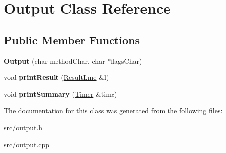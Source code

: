 \hypertarget{class_output}{\section{Output Class Reference}
\label{class_output}
}
\subsection*{Public Member Functions}
\begin{DoxyCompactItemize}
\item 
\hypertarget{class_output_a7f407dc5dc134b08fe85414b290c68fd}{{\bfseries Output} (char method\-Char, char $\ast$flags\-Char)}\label{class_output_a7f407dc5dc134b08fe85414b290c68fd}

\item 
\hypertarget{class_output_a2ca28367f772238c0cda6c7981ae8b80}{void {\bfseries print\-Result} (\hyperlink{class_result_line}{Result\-Line} \&l)}\label{class_output_a2ca28367f772238c0cda6c7981ae8b80}

\item 
\hypertarget{class_output_a989b441fba2532fc6b2ecff4565ebc59}{void {\bfseries print\-Summary} (\hyperlink{class_timer}{Timer} \&time)}\label{class_output_a989b441fba2532fc6b2ecff4565ebc59}

\end{DoxyCompactItemize}


The documentation for this class was generated from the following files\-:\begin{DoxyCompactItemize}
\item 
src/output.\-h\item 
src/output.\-cpp\end{DoxyCompactItemize}
